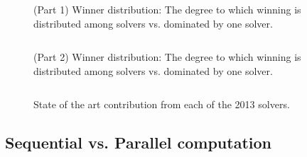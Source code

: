 \documentclass{eptcs}
\begin{document}
\begin{figure}
\centering
\begin{tabular}{|ll|rrrrr|}
\hline

\end{tabular}
\caption{(Part 1) Winner distribution: The degree to which winning is distributed among solvers vs. dominated by one solver.}
\label{Fig:entropyA}
\end{figure}

\begin{figure}
\centering
\begin{tabular}{|ll|rrrrr|}
\hline

\end{tabular}
\caption{(Part 2) Winner distribution: The degree to which winning is distributed among solvers vs. dominated by one solver.}
\label{Fig:entropyB}
\end{figure}


\begin{figure}
\centering
\begin{tabular}{|l|rrr|}
\hline

\hline
\end{tabular}
\caption{State of the art contribution from each of the 2013 solvers.}
\label{Fig:sotac}
\end{figure}

\subsection{Sequential vs. Parallel computation}
\label{parallel}
\end{document}
